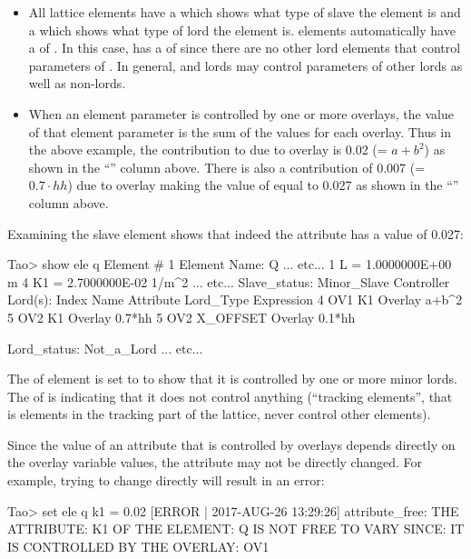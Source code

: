 \documentclass{hitec}     %
\begin{document}
{{{{\begin{itemize}[leftmargin=*]
\item
All lattice elements have a  which shows what type of slave the element is and a
 which shows what type of lord the element is.  elements automatically
have a  of . In this case,  has a  of
 since there are no other lord elements that control parameters of . In general,
 and  lords may control parameters of other lords as well as non-lords.
\item
When an element parameter is controlled by one or more overlays, the value of that element parameter
is the sum of the values for each overlay. Thus in the above example, the contribution to  due
to overlay  is 0.02 (= $a+b^2$) as shown in the ``'' column above. There is 
also a contribution of 0.007 (= $0.7 \cdot hh$) due to overlay  making the value of 
equal to 0.027 as shown in the ``'' column above. 
\end{itemize}

Examining the  slave element shows that indeed the  attribute has a value of 0.027:
\begin{code}
Tao> show ele q
 Element #                1
 Element Name: Q
        ... etc...
    1   L                           =  1.0000000E+00 m
    4   K1                          =  2.7000000E-02 1/m^2
        ... etc...
Slave_status: Minor_Slave
Controller Lord(s):
   Index   Name        Attribute           Lord_Type           Expression
       4   OV1         K1                  Overlay             a+b^2
       5   OV2         K1                  Overlay             0.7*hh
       5   OV2         X_OFFSET            Overlay             0.1*hh

Lord_status:  Not_a_Lord
        ... etc...
\end{code}

The  of element  is set to  to show that it is controlled by
one or more minor lords. The  of  is  indicating that it does
not control anything (``tracking elements'', that is elements in the tracking part of the lattice,
never control other elements).

Since the value of an attribute that is controlled by overlays depends directly on the overlay
variable values, the attribute may not be directly changed. For example, trying to change
 directly will result in an error:
\begin{code}
Tao> set ele q k1 = 0.02
[ERROR | 2017-AUG-26 13:29:26] attribute_free:
    THE ATTRIBUTE: K1
    OF THE ELEMENT: Q
    IS NOT FREE TO VARY SINCE:
    IT IS CONTROLLED BY THE OVERLAY: OV1
\end{code}

}}}}
\end{document}
